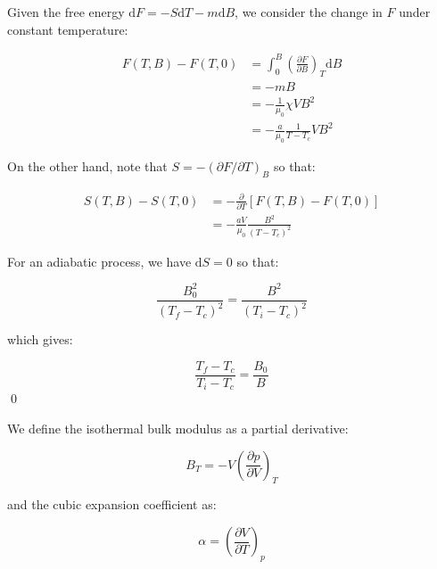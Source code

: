 \documentclass[12pt]{article}
\begin{document}
Given the free energy $\mathrm{d}F = -S\mathrm{d}T - m\mathrm{d}B$, we consider the change in $F$ under constant temperature:

\begin{equation}
    \begin{split}
        F(T, B) - F(T, 0) &= \int_{0}^{B} \left( \frac{\partial F}{\partial B} \right)_{T} \mathrm{d}B \\
        &= -mB \\
        &= -\frac{1}{\mu_{0}} \chi V B^{2} \\
        &= -\frac{a}{\mu_{0}} \frac{1}{T - T_{c}} V B^{2}
    \end{split}
\end{equation}

On the other hand, note that $S = -(\partial F/\partial T)_{B}$ so that:

\begin{equation}
    \begin{split}
        S(T, B) - S(T, 0) &= -\frac{\partial }{\partial T} \left[ F(T, B) - F(T, 0) \right] \\
        &= -\frac{aV}{\mu_{0}} \frac{B^{2}}{(T - T_{c})^{2}}
    \end{split}
\end{equation}

For an adiabatic process, we have $\mathrm{d}S = 0$ so that:

\begin{equation}
    \frac{B_{0}^{2}}{(T_{f} - T_{c})^{2}} = \frac{B^{2}}{(T_{i} - T_{c})^{2}}
\end{equation}

which gives:

\begin{equation}
    \frac{T_{f} - T_{c}}{T_{i} - T_{c}} = \frac{B_{0}}{B}
\end{equation}
\qed


We define the isothermal bulk modulus as a partial derivative:

\begin{equation}
    B_{T} = -V \left( \frac{\partial p}{\partial V} \right)_{T}
\end{equation}

and the cubic expansion coefficient as:

\begin{equation}
    \alpha = \left( \frac{\partial V}{\partial T} \right)_{p}
\end{equation}
\end{document}

